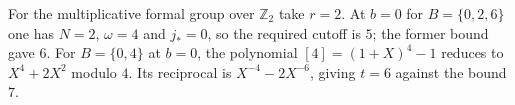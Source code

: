 For the multiplicative formal group over $\mathbb Z_2$ take $r=2$.
At $b=0$ for $B=\{0,2,6\}$ one has $N=2$, $\omega=4$ and $j_*=0$,
so the required cutoff is $5$; the former bound gave $6$.
For $B=\{0,4\}$ at $b=0$, the polynomial
$[4]=(1+X)^4-1$ reduces to $X^4+2X^2$ modulo $4$.
Its reciprocal is $X^{-4}-2X^{-6}$, giving $t=6$ against the bound $7$.
